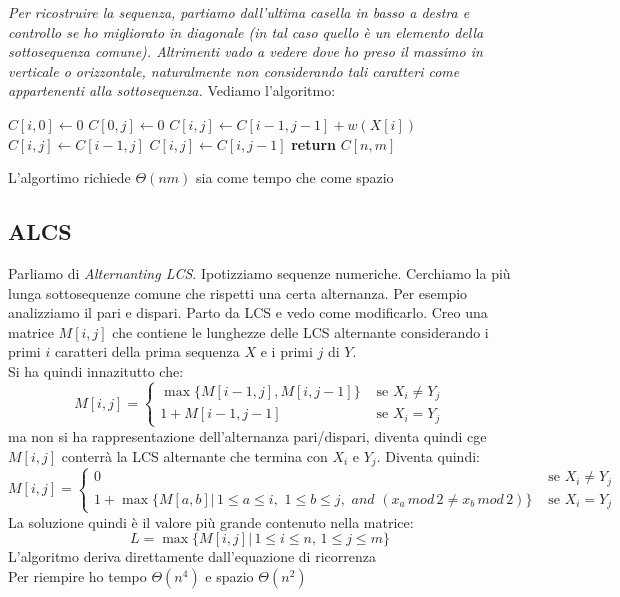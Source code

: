\documentclass[a4paper,12pt, oneside]{book}
\begin{document}
\textit{Per ricostruire la sequenza, partiamo dall’ultima casella in
  basso a destra e controllo se ho migliorato in diagonale (in tal
  caso quello è un elemento della sottosequenza comune). Altrimenti
  vado a vedere dove ho preso il massimo in verticale o orizzontale,
  naturalmente non considerando tali caratteri come appartenenti alla
  sottosequenza.}
\newpage
Vediamo l'algoritmo:
\begin{algorithm}
  \begin{algorithmic}
    \State $C[i,0]\gets 0$
    \EndFor
    \State $C[0,j]\gets 0$
    \EndFor
    \State $C[i,j]\gets C[i-1,j-1]+w(X[i])$
    \Else
    \State $C[i,j]\gets C[i-1,j]$
    \State $C[i,j]\gets C[i, j-1]$
    \EndIf
    \EndIf
    \EndFor
    \EndFor
    \State \textbf{return} $C[n,m]$
    \EndFunction
  \end{algorithmic}
\end{algorithm}
L'algortimo richiede $\Theta(nm)$ sia come tempo che come spazio
\subsection{ALCS}
Parliamo di \textit{Alternanting LCS}. Ipotizziamo sequenze
numeriche. Cerchiamo la più lunga sottosequenze comune che rispetti
una certa alternanza. Per esempio analizziamo il pari e dispari.
Parto da LCS e vedo come modificarlo. Creo una matrice $M[i,j]$ che
contiene le lunghezze delle LCS alternante considerando i primi $i$
caratteri della prima sequenza $X$ e i primi $j$ di $Y$.\\
Si ha quindi innazitutto che:
\[ M[i,j]=
  \begin{cases}
    \max\{M[i-1,j], M[i,j-1]\} & \mbox{ se } X_i\neq Y_j\\
    1+M[i-1,j-1] & \mbox{ se } X_i=Y_j
  \end{cases}
\]
ma non si ha rappresentazione dell'alternanza pari/dispari, diventa
quindi cge $M[i,j]$ conterrà la LCS alternante che termina con  $X_i$
e $Y_j$. Diventa quindi:
\[ M[i,j]=
  \begin{cases}
    0 & \mbox{ se } X_i\neq Y_j\\
    1+\max\{M[a,b]|\, 1\leq a \leq i,\,\,1\leq b\leq j,\,\,and\,\,
    (x_a\,mod\, 2 \neq x_b\,mod\, 2)\} & \mbox{ se } X_i=Y_j
  \end{cases}
\]
La soluzione quindi è il valore più grande contenuto nella matrice:
\[L=\max\{M[i,j]|\,1\leq i\leq n,\, 1\leq j\leq m\}\]
L'algoritmo deriva direttamente dall'equazione di ricorrenza\\
Per riempire ho tempo $\Theta(n^4)$ e spazio $\Theta(n^2)$
\end{document}
